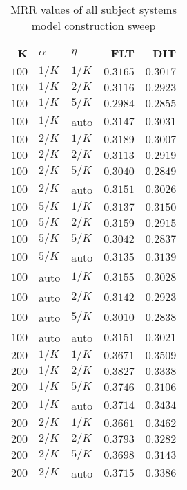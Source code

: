 
\begin{table}
\begin{spacing}{1.2}
\centering
\caption{MRR values of all subject systems model construction sweep}
\label{table:all_model_sweep}
\vspace{0.2em}
\parbox{.45\linewidth}{\centering \begin{tabular}{rll|rr}
\toprule
    K &  $\alpha$ &    $\eta$ &      FLT &      DIT \\
\midrule
$100$ &  $1/K$ &  $1/K$ & $0.3165$ & $0.3017$ \\
$100$ &  $1/K$ &  $2/K$ & $0.3116$ & $0.2923$ \\
$100$ &  $1/K$ &  $5/K$ & $0.2984$ & $0.2855$ \\
$100$ &  $1/K$ &   auto & $0.3147$ & $0.3031$ \\
$100$ &  $2/K$ &  $1/K$ & $0.3189$ & $0.3007$ \\
$100$ &  $2/K$ &  $2/K$ & $0.3113$ & $0.2919$ \\
$100$ &  $2/K$ &  $5/K$ & $0.3040$ & $0.2849$ \\
$100$ &  $2/K$ &   auto & $0.3151$ & $0.3026$ \\
$100$ &  $5/K$ &  $1/K$ & $0.3137$ & $0.3150$ \\
$100$ &  $5/K$ &  $2/K$ & $0.3159$ & $0.2915$ \\
$100$ &  $5/K$ &  $5/K$ & $0.3042$ & $0.2837$ \\
$100$ &  $5/K$ &   auto & $0.3135$ & $0.3139$ \\
$100$ &   auto &  $1/K$ & $0.3155$ & $0.3028$ \\
$100$ &   auto &  $2/K$ & $0.3142$ & $0.2923$ \\
$100$ &   auto &  $5/K$ & $0.3010$ & $0.2838$ \\
$100$ &   auto &   auto & $0.3151$ & $0.3021$ \\
$200$ &  $1/K$ &  $1/K$ & $0.3671$ & $0.3509$ \\
$200$ &  $1/K$ &  $2/K$ & $0.3827$ & $0.3338$ \\
$200$ &  $1/K$ &  $5/K$ & $0.3746$ & $0.3106$ \\
$200$ &  $1/K$ &   auto & $0.3714$ & $0.3434$ \\
$200$ &  $2/K$ &  $1/K$ & $0.3661$ & $0.3462$ \\
$200$ &  $2/K$ &  $2/K$ & $0.3793$ & $0.3282$ \\
$200$ &  $2/K$ &  $5/K$ & $0.3698$ & $0.3143$ \\
$200$ &  $2/K$ &   auto & $0.3715$ & $0.3386$ \\

\end{tabular}}
\end{spacing}
\end{table}
